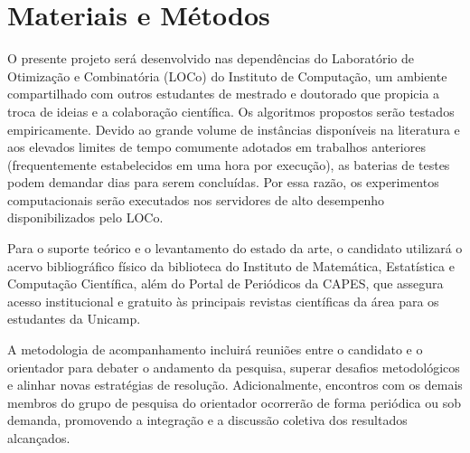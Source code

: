 \section{Materiais e Métodos}

O presente projeto será desenvolvido nas dependências do Laboratório de Otimização e Combinatória (LOCo) do Instituto de Computação, um ambiente compartilhado com outros estudantes de mestrado e doutorado que propicia a troca de ideias e a colaboração científica. Os algoritmos propostos serão testados empiricamente. Devido ao grande volume de instâncias disponíveis na literatura e aos elevados limites de tempo comumente adotados em trabalhos anteriores (frequentemente estabelecidos em uma hora por execução), as baterias de testes podem demandar dias para serem concluídas. Por essa razão, os experimentos computacionais serão executados nos servidores de alto desempenho disponibilizados pelo LOCo.

Para o suporte teórico e o levantamento do estado da arte, o candidato utilizará o acervo bibliográfico físico da biblioteca do Instituto de Matemática, Estatística e Computação Científica, além do Portal de Periódicos da CAPES, que assegura acesso institucional e gratuito às principais revistas científicas da área para os estudantes da Unicamp.

A metodologia de acompanhamento incluirá reuniões entre o candidato e o orientador para debater o andamento da pesquisa, superar desafios metodológicos e alinhar novas estratégias de resolução. Adicionalmente, encontros com os demais membros do grupo de pesquisa do orientador ocorrerão de forma periódica ou sob demanda, promovendo a integração e a discussão coletiva dos resultados alcançados.